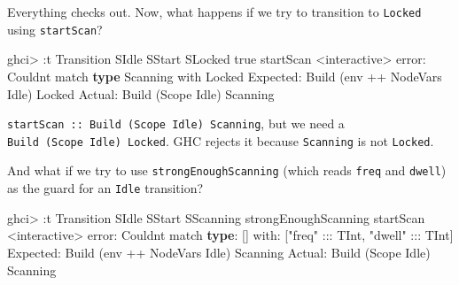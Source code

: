 \documentclass[]{article}
\newenvironment{Shaded}{}{}
\newcommand{\DataTypeTok}[1]{\textcolor[rgb]{0.56,0.13,0.00}{#1}}
\newcommand{\FunctionTok}[1]{\textcolor[rgb]{0.02,0.16,0.49}{#1}}
\newcommand{\KeywordTok}[1]{\textcolor[rgb]{0.00,0.44,0.13}{\textbf{#1}}}
\newcommand{\NormalTok}[1]{#1}
\newcommand{\OperatorTok}[1]{\textcolor[rgb]{0.40,0.40,0.40}{#1}}
\newcommand{\StringTok}[1]{\textcolor[rgb]{0.25,0.44,0.63}{#1}}
\begin{document}
Everything checks out. Now, what happens if we try to transition to
\texttt{Locked} using \texttt{startScan}?

\begin{Shaded}
\begin{Highlighting}[]
\NormalTok{ghci}\OperatorTok{\textgreater{}} \OperatorTok{:}\NormalTok{t }\DataTypeTok{Transition} \DataTypeTok{SIdle} \DataTypeTok{SStart} \DataTypeTok{SLocked}\NormalTok{ true startScan}
\OperatorTok{\textless{}}\NormalTok{interactive}\OperatorTok{\textgreater{}} \FunctionTok{error}\OperatorTok{:}
    \DataTypeTok{Couldn\textquotesingle{}t}\NormalTok{ match }\KeywordTok{type} \DataTypeTok{\textquotesingle{}Scanning\textquotesingle{}}\NormalTok{ with }\DataTypeTok{\textquotesingle{}Locked\textquotesingle{}}
      \DataTypeTok{Expected}\OperatorTok{:} \DataTypeTok{Build}\NormalTok{ (env }\OperatorTok{++} \DataTypeTok{NodeVars} \DataTypeTok{Idle}\NormalTok{) }\DataTypeTok{Locked}
        \DataTypeTok{Actual}\OperatorTok{:} \DataTypeTok{Build}\NormalTok{ (}\DataTypeTok{Scope} \DataTypeTok{Idle}\NormalTok{) }\DataTypeTok{Scanning}
\end{Highlighting}
\end{Shaded}

\texttt{startScan\ ::\ Build\ (Scope\ Idle)\ Scanning}, but we need a
\texttt{Build\ (Scope\ Idle)\ Locked}. GHC rejects it because \texttt{Scanning}
is not \texttt{Locked}.

And what if we try to use \texttt{strongEnoughScanning} (which reads
\texttt{freq} and \texttt{dwell}) as the guard for an \texttt{Idle} transition?

\begin{Shaded}
\begin{Highlighting}[]
\NormalTok{ghci}\OperatorTok{\textgreater{}} \OperatorTok{:}\NormalTok{t }\DataTypeTok{Transition} \DataTypeTok{SIdle} \DataTypeTok{SStart} \DataTypeTok{SScanning}\NormalTok{ strongEnoughScanning startScan}
\OperatorTok{\textless{}}\NormalTok{interactive}\OperatorTok{\textgreater{}} \FunctionTok{error}\OperatorTok{:}
    \DataTypeTok{Couldn\textquotesingle{}t}\NormalTok{ match }\KeywordTok{type}\OperatorTok{:}\NormalTok{ \textquotesingle{}[]}
\NormalTok{                   with}\OperatorTok{:}\NormalTok{ [}\StringTok{"freq"} \OperatorTok{:::} \DataTypeTok{TInt}\NormalTok{, }\StringTok{"dwell"} \OperatorTok{:::} \DataTypeTok{TInt}\NormalTok{]}
      \DataTypeTok{Expected}\OperatorTok{:} \DataTypeTok{Build}\NormalTok{ (env }\OperatorTok{++} \DataTypeTok{NodeVars} \DataTypeTok{Idle}\NormalTok{) }\DataTypeTok{Scanning}
        \DataTypeTok{Actual}\OperatorTok{:} \DataTypeTok{Build}\NormalTok{ (}\DataTypeTok{Scope} \DataTypeTok{Idle}\NormalTok{) }\DataTypeTok{Scanning}
\end{Highlighting}
\end{Shaded}
\end{document}
